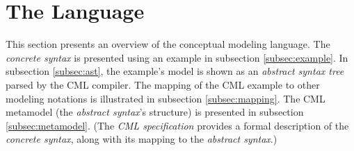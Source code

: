 \section{The Language}\label{sec:lang}
%
This section presents an overview of the conceptual modeling language.
The \emph{concrete syntax} is presented using an example in subsection \ref{subsec:example}. 
In subsection \ref{subsec:ast},
the example's model is shown as an \emph{abstract syntax tree} parsed by the CML compiler.
The mapping of the CML example to other modeling notations is illustrated in subsection \ref{subsec:mapping}.
The CML metamodel (the \emph{abstract syntax}'s structure) is presented in subsection \ref{subsec:metamodel}. 
(The \emph{CML specification} \cite{cml-spec} provides a formal description of the \emph{concrete syntax},
along with its mapping to the \emph{abstract syntax}.)






